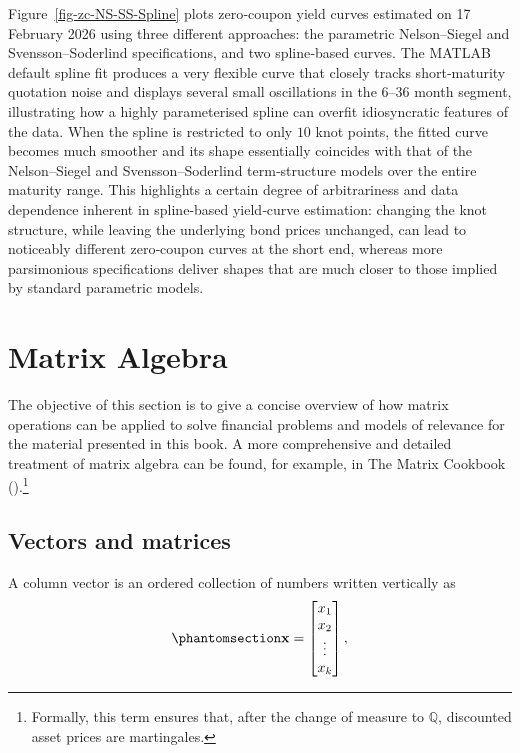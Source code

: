 \documentclass[
  letterpaper,
  DIV=11,
  numbers=noendperiod]{scrreprt}
\begin{document}
Figure~\ref{fig-zc-NS-SS-Spline} plots zero‑coupon yield curves
estimated on 17 February 2026 using three different approaches: the
parametric Nelson--Siegel and Svensson--Soderlind specifications, and
two spline‑based curves. The MATLAB default spline fit produces a very
flexible curve that closely tracks short‑maturity quotation noise and
displays several small oscillations in the 6--36 month segment,
illustrating how a highly parameterised spline can overfit idiosyncratic
features of the data. When the spline is restricted to only \(10\) knot
points, the fitted curve becomes much smoother and its shape essentially
coincides with that of the Nelson--Siegel and Svensson--Soderlind
term‑structure models over the entire maturity range. This highlights a
certain degree of arbitrariness and data dependence inherent in
spline‑based yield‑curve estimation: changing the knot structure, while
leaving the underlying bond prices unchanged, can lead to noticeably
different zero‑coupon curves at the short end, whereas more parsimonious
specifications deliver shapes that are much closer to those implied by
standard parametric models.


\chapter{Matrix Algebra}\label{matrix-algebra}

The objective of this section is to give a concise overview of how
matrix operations can be applied to solve financial problems and models
of relevance for the material presented in this book. A more
comprehensive and detailed treatment of matrix algebra can be found, for
example, in The Matrix Cookbook ().\footnote{Formally, this term ensures
  that, after the change of measure to \(\mathbb{Q}\), discounted asset
  prices are martingales.}

\section{Vectors and matrices}\label{vectors-and-matrices}

A column vector is an ordered collection of numbers written vertically
as \begin{equation}\protect\phantomsection\label{eq-gen-0044}{  
\begin{align}
    \mathbf{x} = \begin{bmatrix}
        x_{1} \\ x_{2} \\ \vdots \\ x_{k}
\end{bmatrix},
\end{align}
}\end{equation}
\end{document}

